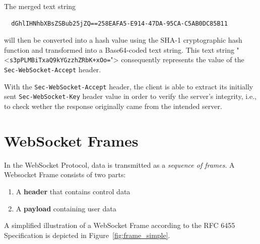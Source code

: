 \documentclass[a4paper, justified, notoc]{tufte-handout} %
\begin{document}
The merged text string 
\begin{Verbatim}
  dGhlIHNhbXBsZSBub25jZQ==258EAFA5-E914-47DA-95CA-C5AB0DC85B11
\end{Verbatim}
will then be converted into a hash value using the SHA-1 cryptographic hash function and transformed into a Base64-coded text string. This text string "<\texttt{s3pPLMBiTxaQ9kYGzzhZRbK+xOo=}"> consequently represents the value of the \texttt{Sec-WebSocket-Accept} header.

With the \texttt{Sec-WebSocket-Accept} header, the client is able to extract its initially sent \texttt{Sec-WebSocket-Key} header value in order to verify the server's integrity, i.e., to check wether the response originally came from the intended server.



\section{WebSocket Frames} %
\label{sec:the_dataframe}

In the WebSocket Protocol, data is transmitted as a \emph{sequence of frames}. A Websocket Frame consists of two parts:
\begin{enumerate}
	\item A \textbf{header} that contains control data
	\item A \textbf{payload} containing user data
\end{enumerate}
A simplified illustration of a WebSocket Frame according to the RFC 6455 Specification is depicted in Figure~\ref{fig:frame_simple}.
\end{document}
